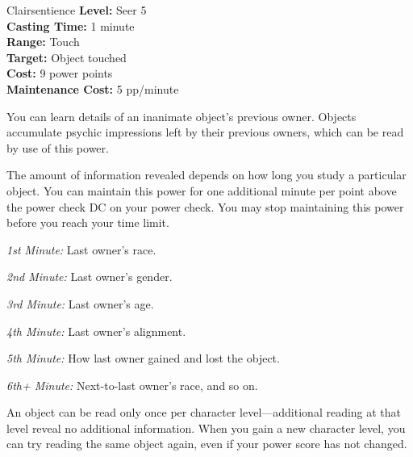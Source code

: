 {Clairsentience}
{
	\textbf{Level:}
	Seer 5\\
	\textbf{Casting Time:}
	1 minute\\
	\textbf{Range:}
	Touch\\
	\textbf{Target:}
	Object touched\\
	\textbf{Cost:}
	9 power points\\
	\textbf{Maintenance Cost:}
	5 pp/minute\\
}
{
	You can learn details of an inanimate object's previous owner. Objects accumulate psychic impressions left by their previous owners, which can be read by use of this power.

	The amount of information revealed depends on how long you study a particular object. You can maintain this power for one additional minute per point above the power check DC on your power check. You may stop maintaining this power before you reach your time limit.

	\textit{1st Minute:} Last owner's race.

	\textit{2nd Minute:} Last owner's gender.

	\textit{3rd Minute:} Last owner's age.

	\textit{4th Minute:} Last owner's alignment.

	\textit{5th Minute:} How last owner gained and lost the object.

	\textit{6th+ Minute:} Next-to-last owner's race, and so on.

	An object can be read only once per character level---additional reading at that level reveal no additional information. When you gain a new character level, you can try reading the same object again, even if your power score has not changed.
}